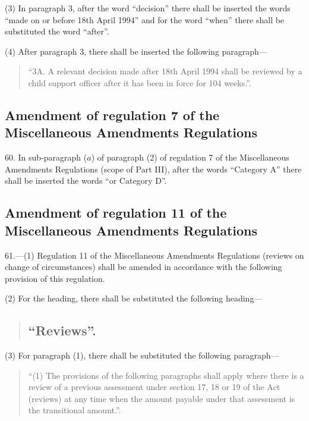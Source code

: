 \documentclass[12pt,a4paper]{article}
\begin{document}
(3) In paragraph 3, after the word “decision” there shall be inserted the words “made on or before 18th April 1994” and for the word “when” there shall be substituted the word “after”.

(4) After paragraph 3, there shall be inserted the following paragraph—
\begin{quotation}
“3A.  A relevant decision made after 18th April 1994 shall be reviewed by a child support officer after it has been in force for 104 weeks.”.
\end{quotation}

\subsection[60. Amendment of regulation 7 of the Miscellaneous Amendments Regulations]{Amendment of regulation 7 of the Miscellaneous Amendments Regulations}

60.  In sub-paragraph ($a$) of paragraph (2) of regulation 7 of the Miscellaneous Amendments Regulations (scope of Part III), after the words “Category A” there shall be inserted the words “or Category D”.

\subsection[61. Amendment of regulation 11 of the Miscellaneous Amendments Regulations]{\sloppy Amendment of regulation 11 of the Miscellaneous Amendments Regulations}

61.—(1) Regulation 11 of the Miscellaneous Amendments Regulations (reviews on change of circumstances) shall be amended in accordance with the following provision of this regulation.

(2) For the heading, there shall be substituted the following heading—
\begin{quotation}
\subsection*{“Reviews”.}
\end{quotation}

(3) For paragraph (1), there shall be substituted the following paragraph—
\begin{quotation}
“(1) The provisions of the following paragraphs shall apply where there is a review of a previous assessment under section 17, 18 or 19 of the Act (reviews) at any time when the amount payable under that assessment is the transitional amount.”.
\end{quotation}
\end{document}
